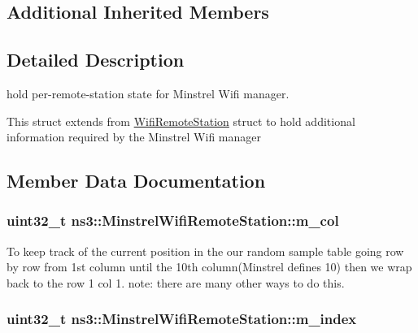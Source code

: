 \subsection*{Additional Inherited Members}


\subsection{Detailed Description}
hold per-\/remote-\/station state for Minstrel Wifi manager. 

This struct extends from \hyperlink{structns3_1_1WifiRemoteStation}{Wifi\+Remote\+Station} struct to hold additional information required by the Minstrel Wifi manager 

\subsection{Member Data Documentation}
\subsubsection[{\texorpdfstring{m\+\_\+col}{m_col}}]{\setlength{\rightskip}{0pt plus 5cm}uint32\+\_\+t ns3\+::\+Minstrel\+Wifi\+Remote\+Station\+::m\+\_\+col}\hypertarget{structns3_1_1MinstrelWifiRemoteStation_a6c5d9084964d9d7d2ea2f4b5aa9d0112}{}\label{structns3_1_1MinstrelWifiRemoteStation_a6c5d9084964d9d7d2ea2f4b5aa9d0112}
To keep track of the current position in the our random sample table going row by row from 1st column until the 10th column(\+Minstrel defines 10) then we wrap back to the row 1 col 1. note\+: there are many other ways to do this. 
\subsubsection[{\texorpdfstring{m\+\_\+index}{m_index}}]{\setlength{\rightskip}{0pt plus 5cm}uint32\+\_\+t ns3\+::\+Minstrel\+Wifi\+Remote\+Station\+::m\+\_\+index}\hypertarget{structns3_1_1MinstrelWifiRemoteStation_afd90dbb3743a793ad63bd9cfab6ecce5}{}\label{structns3_1_1MinstrelWifiRemoteStation_afd90dbb3743a793ad63bd9cfab6ecce5}


